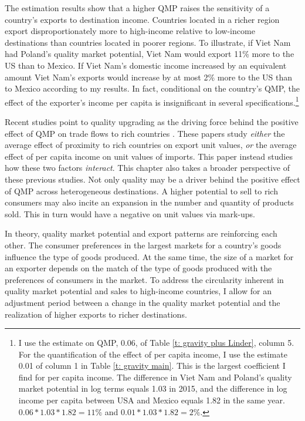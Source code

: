 \documentclass[12pt,a4paper,oneside,times]{article}   	%
\begin{document}
The estimation results show that a higher QMP raises the sensitivity of a country's exports to destination income. Countries located in a richer region export disproportionately more to high-income relative to low-income destinations than countries located in poorer regions. To illustrate, if Viet Nam had Poland's quality market potential, Viet Nam would export 11\% more to the US than to Mexico. If Viet Nam's domestic income increased by an equivalent amount Viet Nam's exports would increase by at most 2\% more to the US than to Mexico according to my results. In fact, conditional on the country's QMP, the effect of the exporter's income per capita is insignificant in several specifications.\footnote{I use the estimate on QMP, 0.06, of Table \ref{t: gravity plus Linder}, column 5. For the quantification of the effect of per capita income, I use the estimate 0.01 of column 1 in Table \ref{t: gravity main}. This is the largest coefficient I find for per capita income. The difference in Viet Nam and Poland's quality market potential in log terms equals 1.03 in 2015, and the difference in log income per capita between USA and Mexico equals 1.82 in the same year. $0.06*1.03*1.82= 11 \%$ and  $0.01*1.03*1.82 = 2\%$.} 

Recent studies point to quality upgrading as the driving force behind the positive effect of QMP on trade flows to rich countries \citep{Lugovskyy2015,Dingel2017,Bastos2010,Bastos2018,Eaton2019}. These papers study \emph{either} the average effect of proximity to rich countries on export unit values, \emph{or} the average effect of per capita income on unit values of imports. This paper instead studies how these two factors \emph{interact}. This chapter also takes a broader perspective of these previous studies. Not only quality may be a driver behind the positive effect of QMP across heterogeneous destinations. A higher potential to sell to rich consumers may also incite an expansion in the number and quantity of products sold. This in turn would have a negative on unit values via mark-ups. 
 



In theory, quality market potential and export patterns are reinforcing each other. The consumer preferences in the largest markets for a country's goods influence the type of goods produced. At the same time, the size of a market for an exporter depends on the match of the type of goods produced with the preferences of consumers in the market. To address the circularity inherent in quality market potential and sales to high-income countries, I allow for an adjustment period between a change in the quality market potential and the realization of higher exports to richer destinations. 
\end{document}
